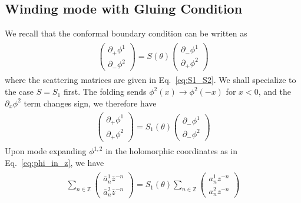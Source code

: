 \subsection{Winding mode with Gluing Condition}
\label{app_sub:compact_gluing_boundary}
We recall that the conformal boundary condition can be written as
\begin{eqnarray}\begin{aligned}
\label{eq:def_S_in_app}
\begin{pmatrix}
\partial_+\phi^1\\
\partial_-\phi^2
\end{pmatrix}
=S(\theta)
\begin{pmatrix}
\partial_-\phi^1\\
\partial_+\phi^2
\end{pmatrix}
\end{aligned}\end{eqnarray}
where the scattering matrices are given in Eq.~\eqref{eq:S1_S2}. We shall specialize to the case $S=S_1$ first. The folding sends $\phi^2(x)\rightarrow\phi^2(-x)$ for $x<0$, and the $\partial_x\phi^2$ term changes sign, we therefore have 
\begin{eqnarray}\begin{aligned}
\label{eq:def_S_in_app_2}
\begin{pmatrix}
\partial_+\phi^1\\
\partial_+\phi^2
\end{pmatrix}
=S_1(\theta)
\begin{pmatrix}
\partial_-\phi^1\\
\partial_-\phi^2
\end{pmatrix}
\end{aligned}\end{eqnarray}
Upon mode expanding $\phi^{1,2}$ in the holomorphic coordinates as in Eq.~\eqref{eq:phi_in_z}, we have
\begin{eqnarray}\begin{aligned}
\label{eq:def_S_in_app_2}
\sum_{n\in\mathbb{Z}}\begin{pmatrix}
\bar{a}_n^1\bar{z}^{-n}\\
\bar{a}_n^2\bar{z}^{-n}
\end{pmatrix}
=S_1(\theta)
\sum_{n\in\mathbb{Z}}
\begin{pmatrix}
a_n^1{z}^{-n}\\
a_n^2{z}^{-n}
\end{pmatrix}
\end{aligned}\end{eqnarray}
